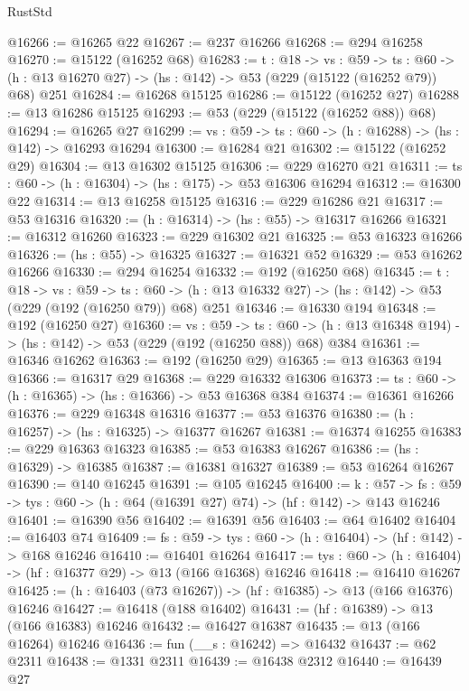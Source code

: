 \begin{lexlean}{RustStd}
\begin{coremodule}
@16266 := @16265 @22
@16267 := @237 @16266
@16268 := @294 @16258
@16270 := @15122 (@16252 @68)
@16283 := {t : @18} ->
  {vs : @59} ->
  {ts : @60} -> (h : @13 @16270 @27) -> (hs : @142) -> @53 (@229 (@15122 (@16252 @79)) @68) @251
@16284 := @16268 @15125
@16286 := @15122 (@16252 @27)
@16288 := @13 @16286 @15125
@16293 := @53 (@229 (@15122 (@16252 @88)) @68)
@16294 := @16265 @27
@16299 := {vs : @59} -> {ts : @60} -> (h : @16288) -> (hs : @142) -> @16293 @16294
@16300 := @16284 @21
@16302 := @15122 (@16252 @29)
@16304 := @13 @16302 @15125
@16306 := @229 @16270 @21
@16311 := {ts : @60} -> (h : @16304) -> (hs : @175) -> @53 @16306 @16294
@16312 := @16300 @22
@16314 := @13 @16258 @15125
@16316 := @229 @16286 @21
@16317 := @53 @16316
@16320 := (h : @16314) -> (hs : @55) -> @16317 @16266
@16321 := @16312 @16260
@16323 := @229 @16302 @21
@16325 := @53 @16323 @16266
@16326 := (hs : @55) -> @16325
@16327 := @16321 @52
@16329 := @53 @16262 @16266
@16330 := @294 @16254
@16332 := @192 (@16250 @68)
@16345 := {t : @18} ->
  {vs : @59} ->
  {ts : @60} -> (h : @13 @16332 @27) -> (hs : @142) -> @53 (@229 (@192 (@16250 @79)) @68) @251
@16346 := @16330 @194
@16348 := @192 (@16250 @27)
@16360 := {vs : @59} ->
  {ts : @60} -> (h : @13 @16348 @194) -> (hs : @142) -> @53 (@229 (@192 (@16250 @88)) @68) @384
@16361 := @16346 @16262
@16363 := @192 (@16250 @29)
@16365 := @13 @16363 @194
@16366 := @16317 @29
@16368 := @229 @16332 @16306
@16373 := {ts : @60} -> (h : @16365) -> (hs : @16366) -> @53 @16368 @384
@16374 := @16361 @16266
@16376 := @229 @16348 @16316
@16377 := @53 @16376
@16380 := (h : @16257) -> (hs : @16325) -> @16377 @16267
@16381 := @16374 @16255
@16383 := @229 @16363 @16323
@16385 := @53 @16383 @16267
@16386 := (hs : @16329) -> @16385
@16387 := @16381 @16327
@16389 := @53 @16264 @16267
@16390 := @140 @16245
@16391 := @105 @16245
@16400 := {k : @57} ->
  {fs : @59} -> {tys : @60} -> (h : @64 (@16391 @27) @74) -> (hf : @142) -> @143 @16246
@16401 := @16390 @56
@16402 := @16391 @56
@16403 := @64 @16402
@16404 := @16403 @74
@16409 := {fs : @59} -> {tys : @60} -> (h : @16404) -> (hf : @142) -> @168 @16246
@16410 := @16401 @16264
@16417 := {tys : @60} -> (h : @16404) -> (hf : @16377 @29) -> @13 (@166 @16368) @16246
@16418 := @16410 @16267
@16425 := (h : @16403 (@73 @16267)) -> (hf : @16385) -> @13 (@166 @16376) @16246
@16427 := @16418 (@188 @16402)
@16431 := (hf : @16389) -> @13 (@166 @16383) @16246
@16432 := @16427 @16387
@16435 := @13 (@166 @16264) @16246
@16436 := fun (__s : @16242) => @16432
@16437 := @62 @2311
@16438 := @1331 @2311
@16439 := @16438 @2312
@16440 := @16439 @27

\end{coremodule}
\end{lexlean}
